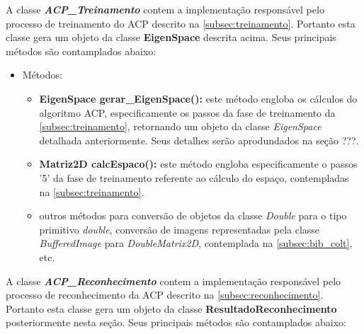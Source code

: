 
A classe \textit{\textbf{ACP\_Treinamento}} contem a implementação responsável pelo processo de treinamento do ACP descrito na \autoref{subsec:treinamento}. Portanto esta classe gera um objeto da classe \textbf{EigenSpace} descrita acima. Seus principais métodos são contamplados abaixo:


\begin{itemize}	
	\item Métodos:
	\begin{itemize}
		\item \textbf{EigenSpace gerar\_EigenSpace():} este método engloba os cálculos do algoritmo ACP, especificamente os passos da fase de treinamento da \autoref{subsec:treinamento}, retornando um objeto da classe \textit{EigenSpace} detalhada anteriormente. Seus detalhes serão aprodundados na seção ???.
		
		\item \textbf{Matriz2D calcEspaco():} este método engloba especificamente o passos '5' da fase de treinamento referente ao cálculo do espaço, contempladas na \autoref{subsec:treinamento}.
		
		\item outros métodos para conversão de objetos da classe \textit{Double} para o tipo primitivo \textit{double}, conversão de imagens representadas pela classe \textit{BufferedImage} para \textit{DoubleMatrix2D}, contemplada na \autoref{subsec:bib_colt}, etc.
		
	\end{itemize}
\end{itemize}



A classe \textit{\textbf{ACP\_Reconhecimento}} contem a implementação responsável pelo processo de reconhecimento da ACP descrito na \autoref{subsec:reconhecimento}. Portanto esta classe gera um objeto da classe \textbf{ResultadoReconhecimento} posteriormente nesta seção. Seus principais métodos são contamplados abaixo:


